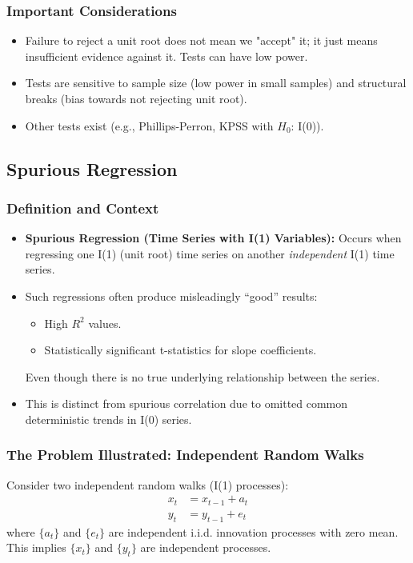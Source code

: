 \documentclass[a4paper, 10pt]{article}
\theoremstyle{definition}	%
\begin{document}
\subsubsection{Important Considerations}
\begin{itemize}
    \item Failure to reject a unit root does not mean we "accept" it; it just means insufficient evidence against it. Tests can have low power.
    \item Tests are sensitive to sample size (low power in small samples) and structural breaks (bias towards not rejecting unit root).
    \item Other tests exist (e.g., Phillips-Perron, KPSS with \(H_0\): I(0)).
\end{itemize}

\subsection{Spurious Regression}

\subsubsection{Definition and Context}
\begin{itemize}
    \item \textbf{Spurious Regression (Time Series with I(1) Variables):} Occurs when regressing one I(1) (unit root) time series on another \textit{independent} I(1) time series.
    \item Such regressions often produce misleadingly ``good'' results:
    \begin{itemize}
        \item High \(R^2\) values.
        \item Statistically significant t-statistics for slope coefficients.
    \end{itemize}
    Even though there is no true underlying relationship between the series.
    \item This is distinct from spurious correlation due to omitted common deterministic trends in I(0) series.
\end{itemize}

\subsubsection{The Problem Illustrated: Independent Random Walks}
Consider two independent random walks (I(1) processes):
\begin{align}
x_t &= x_{t-1} + a_t \label{eq:rw_x} \\
y_t &= y_{t-1} + e_t \label{eq:rw_y}
\end{align}
where \(\{a_t\}\) and \(\{e_t\}\) are independent i.i.d. innovation processes with zero mean. This implies \(\{x_t\}\) and \(\{y_t\}\) are independent processes.
\end{document}
